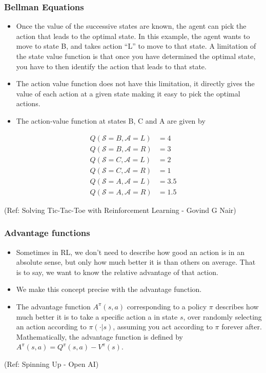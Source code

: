 \begin{frame}[fragile]\frametitle{Bellman Equations}



\begin{itemize}
\item Once the value of the successive states are known, the agent can pick the action that leads to the optimal state. In this example, the agent wants to move to state B, and takes action “L” to move to that state. A limitation of the state value function is that once you have determined the optimal state, you have to then identify the action that leads to that state.
\item The action value function does not have this limitation, it directly gives the value of each action at a given state making it easy to pick the optimal actions.
\item The action-value function at states B, C and A are given by
\end{itemize}


\begin{align*}
Q(\mathcal{S}=B,\mathcal{A}=L) &= 4\\
Q(\mathcal{S}=B,\mathcal{A}=R) &= 3\\
Q(\mathcal{S}=C,\mathcal{A}=L) &= 2\\
Q(\mathcal{S}=C,\mathcal{A}=R) &= 1\\
Q(\mathcal{S}=A,\mathcal{A}=L) &= 3.5\\
Q(\mathcal{S}=A,\mathcal{A}=R) &= 1.5
\end{align*}


{\tiny (Ref: Solving Tic-Tac-Toe with Reinforcement Learning - Govind G Nair)}

\end{frame}

\begin{frame}[fragile]\frametitle{Advantage  functions}

\begin{itemize}
\item Sometimes in RL, we don’t need to describe how good an action is in an absolute sense, but only how much better it is than others on average. That is to say, we want to know the relative advantage of that action. 
\item We make this concept precise with the advantage function.
\item The advantage function $A^{\pi}(s,a)$ corresponding to a policy $\pi$ describes how much better it is to take a specific action a in state $s$, over randomly selecting an action according to $\pi(\cdot|s)$, assuming you act according to $\pi$ forever after. Mathematically, the advantage function is defined by $A^{\pi}(s,a) = Q^{\pi}(s,a) - V^{\pi}(s)$.
\end{itemize}

{\tiny (Ref: Spinning Up - Open AI)}
\end{frame}



